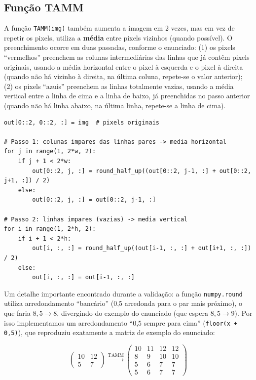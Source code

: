 \documentclass[10pt,twocolumn,letterpaper]{article}
\begin{document}
\subsection{Função TAMM}

A função \texttt{TAMM(img)} também aumenta a imagem em 2 vezes, mas em vez de
repetir os pixels, utiliza a \textbf{média} entre pixels vizinhos (quando
possível). O preenchimento ocorre em duas passadas, conforme o enunciado:
(1) os pixels ``vermelhos'' preenchem as colunas intermediárias das linhas
que já contêm pixels originais, usando a média horizontal entre o pixel à
esquerda e o pixel à direita (quando não há vizinho à direita, na última
coluna, repete-se o valor anterior); (2) os pixels ``azuis'' preenchem as
linhas totalmente vazias, usando a média vertical entre a linha de cima e a
linha de baixo, já preenchidas no passo anterior (quando não há linha
abaixo, na última linha, repete-se a linha de cima).

\begin{lstlisting}[caption={Núcleo da função TAMM (arquivo \texttt{src/tamm.py}).}]
out[0::2, 0::2, :] = img  # pixels originais

# Passo 1: colunas impares das linhas pares -> media horizontal
for j in range(1, 2*w, 2):
    if j + 1 < 2*w:
        out[0::2, j, :] = round_half_up((out[0::2, j-1, :] + out[0::2, j+1, :]) / 2)
    else:
        out[0::2, j, :] = out[0::2, j-1, :]

# Passo 2: linhas impares (vazias) -> media vertical
for i in range(1, 2*h, 2):
    if i + 1 < 2*h:
        out[i, :, :] = round_half_up((out[i-1, :, :] + out[i+1, :, :]) / 2)
    else:
        out[i, :, :] = out[i-1, :, :]
\end{lstlisting}

Um detalhe importante encontrado durante a validação: a função
\texttt{numpy.round} utiliza arredondamento ``bancário'' (0,5 arredonda para
o par mais próximo), o que faria $8{,}5 \to 8$, divergindo do exemplo do
enunciado (que espera $8{,}5 \to 9$). Por isso implementamos um
arredondamento ``0,5 sempre para cima'' (\texttt{floor(x + 0,5)}), que
reproduziu exatamente a matriz de exemplo do enunciado:

\[
\begin{pmatrix}10 & 12\\ 5 & 7\end{pmatrix}
\xrightarrow{\text{TAMM}}
\begin{pmatrix}10 & 11 & 12 & 12\\ 8 & 9 & 10 & 10\\ 5 & 6 & 7 & 7\\ 5 & 6 & 7 & 7\end{pmatrix}
\]
\end{document}
